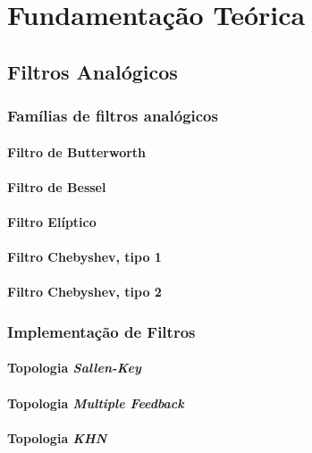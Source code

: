 \chapter{Fundamentação Teórica}

\section{Filtros Analógicos}

\subsection{Famílias de filtros analógicos}

\subsubsection{Filtro de Butterworth}

\subsubsection{Filtro de Bessel}

\subsubsection{Filtro Elíptico}

\subsubsection{Filtro Chebyshev, tipo 1}

\subsubsection{Filtro Chebyshev, tipo 2}

\subsection{Implementação de Filtros}

\subsubsection{Topologia \textit{Sallen-Key}}
\subsubsection{Topologia \textit{Multiple Feedback}}
\subsubsection{Topologia \textit{KHN}}


